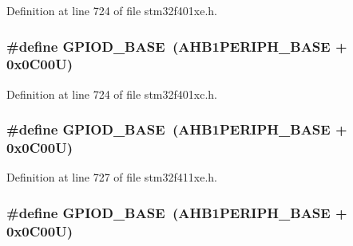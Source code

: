 Definition at line 724 of file stm32f401xe.\+h.

\subsubsection[{\texorpdfstring{G\+P\+I\+O\+D\+\_\+\+B\+A\+SE}{GPIOD_BASE}}]{\setlength{\rightskip}{0pt plus 5cm}\#define G\+P\+I\+O\+D\+\_\+\+B\+A\+SE~({\bf A\+H\+B1\+P\+E\+R\+I\+P\+H\+\_\+\+B\+A\+SE} + 0x0\+C00\+U)}\hypertarget{group___peripheral__registers__structures_ga1a93ab27129f04064089616910c296ec}{}\label{group___peripheral__registers__structures_ga1a93ab27129f04064089616910c296ec}


Definition at line 724 of file stm32f401xc.\+h.

\subsubsection[{\texorpdfstring{G\+P\+I\+O\+D\+\_\+\+B\+A\+SE}{GPIOD_BASE}}]{\setlength{\rightskip}{0pt plus 5cm}\#define G\+P\+I\+O\+D\+\_\+\+B\+A\+SE~({\bf A\+H\+B1\+P\+E\+R\+I\+P\+H\+\_\+\+B\+A\+SE} + 0x0\+C00\+U)}\hypertarget{group___peripheral__registers__structures_ga1a93ab27129f04064089616910c296ec}{}\label{group___peripheral__registers__structures_ga1a93ab27129f04064089616910c296ec}


Definition at line 727 of file stm32f411xe.\+h.

\subsubsection[{\texorpdfstring{G\+P\+I\+O\+D\+\_\+\+B\+A\+SE}{GPIOD_BASE}}]{\setlength{\rightskip}{0pt plus 5cm}\#define G\+P\+I\+O\+D\+\_\+\+B\+A\+SE~({\bf A\+H\+B1\+P\+E\+R\+I\+P\+H\+\_\+\+B\+A\+SE} + 0x0\+C00\+U)}\hypertarget{group___peripheral__registers__structures_ga1a93ab27129f04064089616910c296ec}{}\label{group___peripheral__registers__structures_ga1a93ab27129f04064089616910c296ec}


